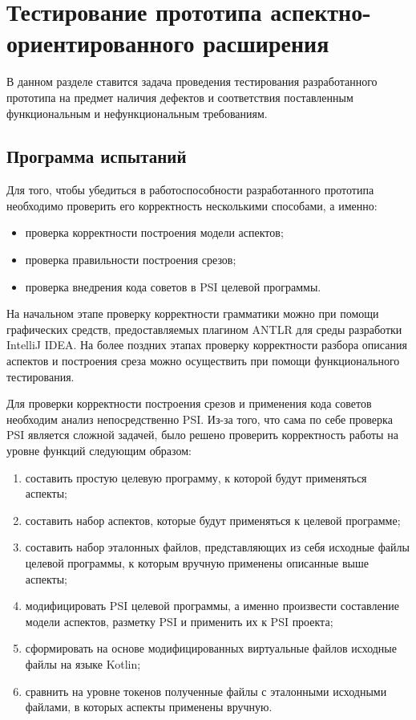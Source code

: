 \chapter{Тестирование прототипа аспектно-ориентированного расширения}
В данном разделе ставится задача проведения тестирования разработанного прототипа на предмет наличия дефектов и соответствия поставленным функциональным и нефункциональным требованиям.
\section{Программа испытаний}
\label{sec:testing_program}
Для того, чтобы убедиться в работоспособности разработанного прототипа необходимо проверить его корректность несколькими способами, а именно:
\begin{itemize}
	\item проверка корректности построения модели аспектов;
	\item проверка правильности построения срезов;
	\item проверка внедрения кода советов в PSI целевой программы.
\end{itemize}

На начальном этапе проверку корректности грамматики можно при помощи графических средств, предоставляемых плагином ANTLR для среды разработки IntelliJ IDEA.
На более поздних этапах проверку корректности разбора описания аспектов и построения среза можно осуществить при помощи функционального тестирования.\

Для проверки корректности построения срезов и применения кода советов необходим анализ непосредственно PSI.
Из-за того, что сама по себе проверка PSI является сложной задачей, было решено
проверить корректность работы на уровне функций следующим образом:
\begin{enumerate}
	\item составить простую целевую программу, к которой будут применяться аспекты;
    \item составить набор аспектов, которые будут применяться к целевой
          программе;
    \item составить набор эталонных файлов, представляющих из себя исходные
          файлы целевой программы, к которым вручную применены описанные выше
          аспекты;
	\item модифицировать PSI целевой программы, а именно произвести составление
	      модели аспектов, разметку PSI и применить их к PSI проекта;
	\item сформировать на основе  модифицированных виртуальные файлов исходные
	      файлы на языке Kotlin;
	\item сравнить на уровне токенов полученные файлы с эталонными исходными
	      файлами, в которых аспекты применены вручную.		  
\end{enumerate}

